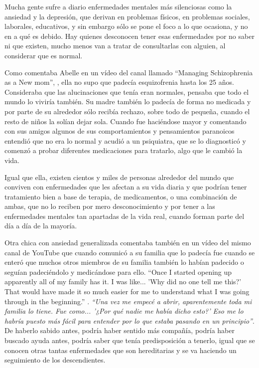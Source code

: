 \documentclass[12pt, a4paper,twoside,titlepage]{book}
\begin{document}
Mucha gente sufre a diario enfermedades mentales más silenciosas como la ansiedad y la depresión, que derivan en problemas físicos, en problemas sociales, laborales, educativos, y sin embargo sólo se pone el foco a lo que ocasiona, y no en a qué es debido. Hay quienes desconocen tener esas enfermedades por no saber ni que existen, mucho menos van a tratar de consultarlas con alguien, al considerar que es normal. 

Como comentaba Abelle en un vídeo del canal  llamado ``Managing Schizophrenia as a New mom'', \cite{videoEsquizofrenia}, ella no supo que padecía esquizofrenia hasta los 25 años. Consideraba que las alucinaciones que tenía eran normales, pensaba que todo el mundo lo viviría también. Su madre también lo padecía de forma no medicada y por parte de su alrededor sólo recibía rechazo, sobre todo de pequeña, cuando el resto de niños la solían dejar sola. Cuando fue haciéndose mayor y comentando con sus amigos algunos de sus comportamientos y pensamientos paranoicos entendió que no era lo normal y acudió a un psiquiatra, que se lo diagnosticó y comenzó a probar diferentes medicaciones para tratarlo, algo que le cambió la vida. 

Igual que ella, existen cientos y miles de personas alrededor del mundo que conviven con enfermedades que les afectan a su vida diaria y que podrían tener tratamiento bien a base de terapia, de medicamentos, o una combinación de ambas, que no lo reciben por mero desconocimiento y por tener a las enfermedades mentales tan apartadas de la vida real, cuando forman parte del día a día de la mayoría.

Otra chica con ansiedad generalizada comentaba también en un vídeo del mismo canal de YouTube que cuando comunicó a su familia que lo padecía fue cuando se enteró que muchos otros miembros de su familia también lo habían padecido o seguían padeciéndolo y medicándose para ello. ``Once I started opening up apparently all of my family has it. I was like... 'Why did no one tell me this?' That would have made it so much easier for me to understand what I was going through in the beginning.'' \cite{videoTAG}. \textit{``Una vez me empecé a abrir, aparentemente toda mi familia lo tiene. Fue como... '¿Por qué nadie me había dicho esto?' Eso me lo habría puesto más fácil para entender por lo que estaba pasando en un principio''}. De haberlo sabido antes, podría haber sentido más compañía, podría haber buscado ayuda antes, podría saber que tenía predisposición a tenerlo, igual que se conocen otras tantas enfermedades que son hereditarias y se va haciendo un seguimiento de los descendientes.
\end{document}
